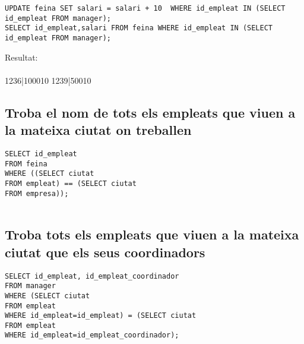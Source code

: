 \documentclass[11p]{article}
\begin{document}
\begin{lstlisting}
UPDATE feina SET salari = salari + 10  WHERE id_empleat IN (SELECT id_empleat FROM manager);
SELECT id_empleat,salari FROM feina WHERE id_empleat IN (SELECT id_empleat FROM manager);
\end{lstlisting}

Resultat:\\\\

1236|100010
1239|50010

\subsection{Troba el nom de tots els empleats que viuen a la mateixa ciutat on treballen}

\begin{lstlisting}
SELECT id_empleat
FROM feina
WHERE ((SELECT ciutat
FROM empleat) == (SELECT ciutat
FROM empresa));


\end{lstlisting}

\subsection{Troba tots els empleats que viuen a la mateixa ciutat que els seus coordinadors}

\begin{lstlisting}
SELECT id_empleat, id_empleat_coordinador
FROM manager
WHERE (SELECT ciutat
FROM empleat
WHERE id_empleat=id_empleat) = (SELECT ciutat
FROM empleat
WHERE id_empleat=id_empleat_coordinador);

\end{lstlisting}
\end{document}
